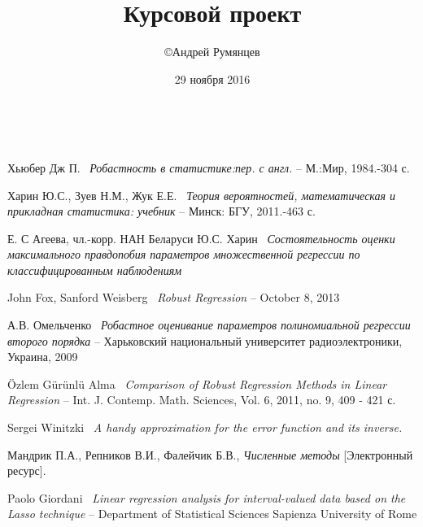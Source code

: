 \documentclass[a4paper,14pt]{extarticle}
\title{Курсовой проект}
\author{\copyright Андрей Румянцев}
\date{29 ноября 2016}
\begin{document}


\newpage 
~~~~~~~~~
\thispagestyle{empty}
\addtocounter{page}{-1}
\mbox{}
\newpage


\tableofcontents
\newpage 

% 


 
\newpage


\newpage


\newpage


\newpage

\newpage
{}
\begin{thebibliography}{8}
    Хьюбер Дж П.~
    \textit{Робастность в статистике:пер. с англ.} --
    М.:Мир, 1984.-304 с.

    Харин Ю.С., Зуев Н.М.,
    Жук Е.Е.~
    \textit{Теория вероятностей, математическая и прикладная статистика: учебник} --
    Минск: БГУ, 2011.-463 с.

    

    Е. С Агеева, чл.-корр. НАН Беларуси Ю.С. Харин~
    \textit{Состоятельность оценки максимального правдопобия параметров множественной регрессии по классифицированным наблюдениям}

    John Fox, Sanford Weisberg~
    \textit{Robust Regression} --
    October 8, 2013

    А.В. Омельченко~
    \textit{Робастное оценивание параметров полиномиальной регрессии второго порядка} --
    Харьковский национальный университет радиоэлектроники, Украина, 2009

    \"{O}zlem G\"{u}r\"{u}nl\"{u} Alma~
    \textit{Comparison of Robust Regression Methods
    in Linear Regression} -- 
    Int. J. Contemp. Math. Sciences, Vol. 6, 2011, no. 9, 409 - 421 с.

    Sergei Winitzki~
    \textit{A handy approximation for the error function and its inverse.}

    Мандрик П.А., Репников В.И., Фалейчик Б.В.,
    \textit{Численные методы} [Электронный ресурс].

    Paolo Giordani~
    \textit{Linear regression analysis for interval-valued data based on the Lasso technique} --
    Department of Statistical Sciences Sapienza University of Rome


\end{thebibliography}
\end{document}

